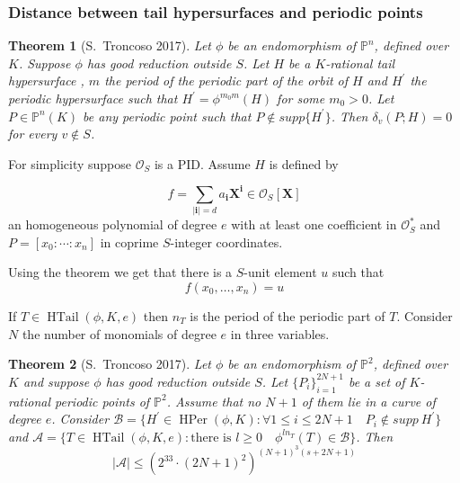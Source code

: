 \documentclass{beamer}
\def\PP{{\mathbb P}}
\DeclareMathOperator{\HTail}{HTail}
\DeclareMathOperator{\HPer}{HPer}
\theoremstyle{thmstyle}
\theoremstyle{thmstyle}
\newtheorem*{mythm}{Theorem}
\theoremstyle{mystyle}
\theoremstyle{qstnstyle}
\begin{document}
\begin{frame}
\frametitle{Distance between tail hypersurfaces and periodic points}
\begin{mythm}[S.\ Troncoso 2017]
Let $\phi$ be an endomorphism of $\PP^n$, defined over $K$. Suppose $\phi$ has good reduction outside $S$. Let $H$ be a $K$-rational tail hypersurface , $m$ the period of the periodic part of the orbit of $H$ and $H^{\prime}$ the periodic hypersurface such that $H^{\prime}=\phi^{m_0m}(H)$ for some $m_0>0$. Let $P\in \PP^n(K)$ be any periodic point such that $P \notin supp\{H^{\prime}\}$. Then $\delta_{v}(P;H)=0$ for every $v\notin S$.
\end{mythm}

For simplicity suppose $\mathcal{O}_S$ is a PID. Assume $H$ is defined by 

$$f=\displaystyle\sum_{|\textbf{i}|= d} a_{\textbf{i}}\textbf{X}^{\textbf{i}} \in \mathcal{O}_S[\textbf{X}] $$ an homogeneous polynomial  of degree $e$ with at least one coefficient in $\mathcal{O}_S^{*}$ and $P=[x_0:\cdots: x_n]$ in coprime $S$-integer coordinates.

\pause Using the theorem we get that there is a $S$-unit element $u$ such that
$$f(x_0,\ldots, x_n)=u $$
\end{frame}

\begin{frame}
If $T \in \HTail(\phi,K, e)$ then $n_T$ is the period of the periodic part of $T$. Consider $N$ the number of monomials of degree $e$ in three variables.

\begin{mythm}[S.\ Troncoso 2017]
Let $\phi$ be an endomorphism of $\PP^2$, defined over $K$ and suppose $\phi$ has good reduction outside $S$. Let $\{P_i\}_{i=1}^{2N+1} $ be a set of $K$-rational periodic points of $\PP^2$. Assume that no $N+1$ of them lie in a curve of degree $e$. Consider $\mathcal{B} =\{ H^{\prime} \in \HPer(\phi,K) \colon \forall  1 \leq i \leq 2N+1 \quad P_i \notin  supp\ H^{\prime}     \} $ and $\mathcal{A}=\{ T \in \HTail(\phi,K, e) \colon \mbox{there is } l\geq 0 \quad \phi^{ln_T}(T) \in \mathcal{B}   \}$.  Then
 $$ |\mathcal{A} | \leq \left(2^{33} \cdot (2N+1)^2\right)^{\left(N+1\right)^3(s+2N+1)}  $$
\end{mythm}
\end{frame}
\end{document}
